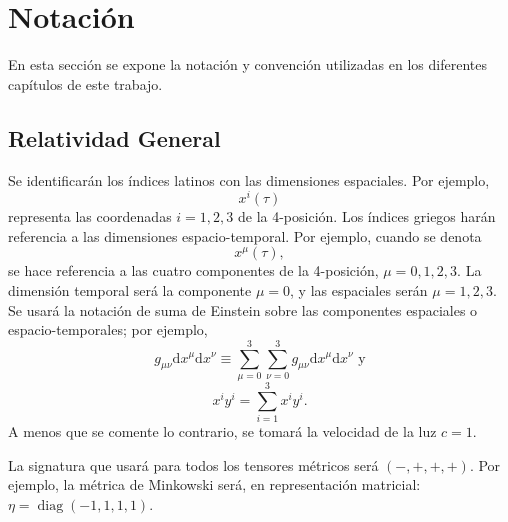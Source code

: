 \chapter*{Notación}
En esta sección se expone la notación y convención utilizadas en los diferentes capítulos de este trabajo.
\section*{Relatividad General}
	Se identificarán los índices latinos con las dimensiones espaciales. Por ejemplo,
	$$x^i(\tau)$$
	representa las coordenadas $i=1,2,3$ de la 4-posición. Los índices griegos harán referencia a las dimensiones espacio-temporal. Por ejemplo, cuando se denota
	$$x^\mu(\tau),$$
	se hace referencia a las cuatro componentes de la 4-posición, $\mu=0,1,2,3$. La dimensión temporal será la componente $\mu=0$, y las espaciales serán $\mu=1,2,3$. Se usará la notación de suma de Einstein sobre las componentes espaciales o espacio-temporales; por ejemplo,
	$$g_{\mu\nu}\mathrm{d}x^\mu \mathrm{d}x^\nu\equiv \sum_{\mu=0}^3 \sum_{\nu=0}^3 g_{\mu\nu}\mathrm{d}x^\mu \mathrm{d}x^\nu \text{ y}$$
	$$x^iy^i=\sum_{i=1}^3 x^iy^i.$$
	A menos que se comente lo contrario, se tomará la velocidad de la luz $c=1$.
	
	La signatura que usará para todos los tensores métricos será $(-,+,+,+)$. Por ejemplo, la métrica de Minkowski será, en representación matricial: $\eta=\mathop{diag}(-1,1,1,1)$.